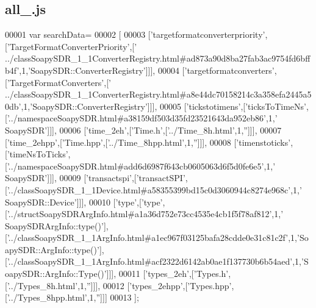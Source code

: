 \subsection{all\+\_.\+js}
\label{all__10_8js_source}

\begin{DoxyCode}
00001 var searchData=
00002 [
00003   [\textcolor{stringliteral}{'targetformatconverterpriority'},[\textcolor{stringliteral}{'TargetFormatConverterPriority'},[\textcolor{stringliteral}{'
      ../classSoapySDR\_1\_1ConverterRegistry.html#ad873a90d8ba27fab3ac9754fd6bffb4f'},1,\textcolor{stringliteral}{'SoapySDR::ConverterRegistry'}]]],
00004   [\textcolor{stringliteral}{'targetformatconverters'},[\textcolor{stringliteral}{'TargetFormatConverters'},[\textcolor{stringliteral}{'
      ../classSoapySDR\_1\_1ConverterRegistry.html#a8e44dc70158214c3a358efa2445a50db'},1,\textcolor{stringliteral}{'SoapySDR::ConverterRegistry'}]]],
00005   [\textcolor{stringliteral}{'tickstotimens'},[\textcolor{stringliteral}{'ticksToTimeNs'},[\textcolor{stringliteral}{'../namespaceSoapySDR.html#a38159df503d35fd23521643da952eb86'},1,\textcolor{stringliteral}{'
      SoapySDR'}]]],
00006   [\textcolor{stringliteral}{'time\_2eh'},[\textcolor{stringliteral}{'Time.h'},[\textcolor{stringliteral}{'../Time\_8h.html'},1,\textcolor{stringliteral}{''}]]],
00007   [\textcolor{stringliteral}{'time\_2ehpp'},[\textcolor{stringliteral}{'Time.hpp'},[\textcolor{stringliteral}{'../Time\_8hpp.html'},1,\textcolor{stringliteral}{''}]]],
00008   [\textcolor{stringliteral}{'timenstoticks'},[\textcolor{stringliteral}{'timeNsToTicks'},[\textcolor{stringliteral}{'../namespaceSoapySDR.html#add6d6987f643cb0605063d6f5d0fe6e5'},1,\textcolor{stringliteral}{'
      SoapySDR'}]]],
00009   [\textcolor{stringliteral}{'transactspi'},[\textcolor{stringliteral}{'transactSPI'},[\textcolor{stringliteral}{'../classSoapySDR\_1\_1Device.html#a58355399bd15c0d3060944c8274e968c'},1,\textcolor{stringliteral}{'
      SoapySDR::Device'}]]],
00010   [\textcolor{stringliteral}{'type'},[\textcolor{stringliteral}{'type'},[\textcolor{stringliteral}{'../structSoapySDRArgInfo.html#a1a36d752e73cc4535e4cb1f5f78af812'},1,\textcolor{stringliteral}{'
      SoapySDRArgInfo::type()'}],[\textcolor{stringliteral}{'../classSoapySDR\_1\_1ArgInfo.html#a1ec967f03125bafa28cdde0e31c81c2f'},1,\textcolor{stringliteral}{'SoapySDR::ArgInfo::type()'}],
      [\textcolor{stringliteral}{'../classSoapySDR\_1\_1ArgInfo.html#acf2322d6142ab0ae1f137730b6b54aed'},1,\textcolor{stringliteral}{'SoapySDR::ArgInfo::Type()'}]]],
00011   [\textcolor{stringliteral}{'types\_2eh'},[\textcolor{stringliteral}{'Types.h'},[\textcolor{stringliteral}{'../Types\_8h.html'},1,\textcolor{stringliteral}{''}]]],
00012   [\textcolor{stringliteral}{'types\_2ehpp'},[\textcolor{stringliteral}{'Types.hpp'},[\textcolor{stringliteral}{'../Types\_8hpp.html'},1,\textcolor{stringliteral}{''}]]]
00013 ];
\end{DoxyCode}

